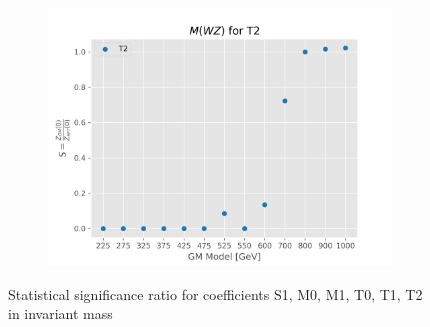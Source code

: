 \documentclass[../Bachelorarbeit.tex]{subfiles}
\begin{document}
\begin{figure}[h]
\begin{subfigure}{0.45\textwidth}
    \end{subfigure}
    \begin{subfigure}{0.45\textwidth}
        \includegraphics[width=\textwidth]{Plots/gm_relevanze/MWZ_op_T2.png}
    \end{subfigure}
    \caption{Statistical significance ratio for coefficients S1, M0, M1, T0, T1, T2 in invariant mass}
\end{figure}
\end{document}
